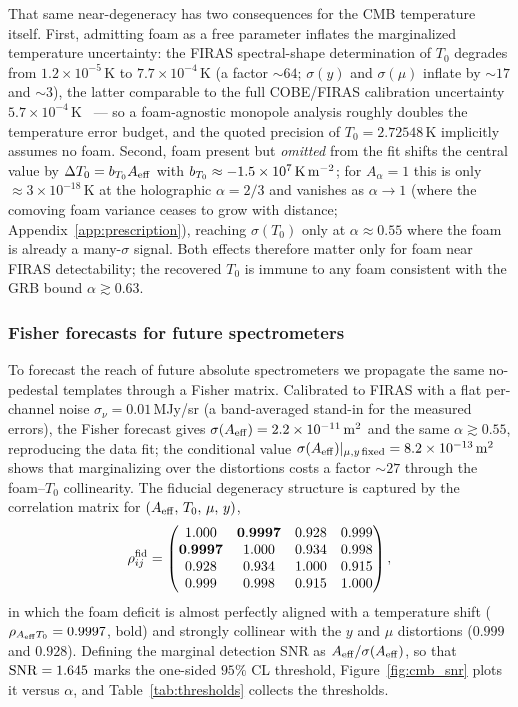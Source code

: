 \documentclass[aps,prd,onecolumn,amsmath,amssymb]{revtex4-2}
\begin{document}
That same near-degeneracy has two consequences for the CMB temperature
itself.  First, admitting foam as a free parameter inflates the
marginalized temperature uncertainty: the FIRAS spectral-shape
determination of $T_0$ degrades from $1.2\times10^{-5}$\,K to
$7.7\times10^{-4}$\,K (a factor $\sim 64$; $\sigma(y)$ and
$\sigma(\mu)$ inflate by $\sim 17$ and $\sim 3$), the latter comparable
to the full COBE/FIRAS calibration uncertainty
$5.7\times10^{-4}$\,K~\cite{Fixsen2009} --- so a foam-agnostic monopole
analysis roughly doubles the temperature error budget, and the quoted
precision of $T_0=2.72548$\,K implicitly assumes no foam.  Second, foam
present but \emph{omitted} from the fit shifts the central value by
$\Delta T_0 = b_{T_0}A_{\rm eff}$ with
$b_{T_0}\approx -1.5\times10^7\,{\rm K\,m^{-2}}$; for $A_\alpha=1$ this
is only $\approx 3\times10^{-18}$\,K at the holographic $\alpha=2/3$ and
vanishes as $\alpha\to1$ (where the comoving foam variance ceases to grow
with distance; Appendix~\ref{app:prescription}), reaching $\sigma(T_0)$ only
at $\alpha\approx 0.55$ where the foam is already a many-$\sigma$
signal.  Both effects therefore matter only for foam near FIRAS
detectability; the recovered $T_0$ is immune to any foam consistent
with the GRB bound $\alpha\gtrsim 0.63$.

\subsubsection{Fisher forecasts for future spectrometers}
\label{sec:CMB_forecast}

To forecast the reach of future absolute spectrometers we propagate the
same no-pedestal templates through a Fisher matrix.  Calibrated to
FIRAS with a flat per-channel noise $\sigma_\nu=0.01$\,MJy/sr (a
band-averaged stand-in for the measured errors), the Fisher forecast
gives $\sigma(A_{\rm eff})=2.2\times10^{-11}\,{\rm m}^2$ and the same
$\alpha\gtrsim 0.55$, reproducing the data fit; the conditional value
$\sigma(A_{\rm eff})|_{\mu,y\,\text{fixed}}=8.2\times10^{-13}\,{\rm
m}^2$ shows that marginalizing over the distortions costs a factor
$\sim 27$ through the foam--$T_0$ collinearity.  The fiducial
degeneracy structure is captured by the correlation matrix for
$(A_{\rm eff},\,T_0,\,\mu,\,y)$,
\begin{equation}
\rho^{\rm fid}_{ij} = \begin{pmatrix}
  1.000 & \mathbf{0.9997} & 0.928 & 0.999 \\
  \mathbf{0.9997} & 1.000 & 0.934 & 0.998 \\
  0.928 & 0.934 & 1.000 & 0.915 \\
  0.999 & 0.998 & 0.915 & 1.000
\end{pmatrix},
\label{eq:fisher_corr_matrix_fid}
\end{equation}
in which the foam deficit is almost perfectly aligned with a
temperature shift ($\rho_{A_{\rm eff}T_0}=0.9997$, bold) and strongly
collinear with the $y$ and $\mu$ distortions ($0.999$ and $0.928$).
Defining the marginal detection SNR as $A_{\rm eff}/\sigma(A_{\rm
eff})$, so that ${\rm SNR}=1.645$ marks the one-sided $95\%$ CL threshold,
Figure~\ref{fig:cmb_snr} plots it versus $\alpha$, and
Table~\ref{tab:thresholds} collects the thresholds.
\end{document}
